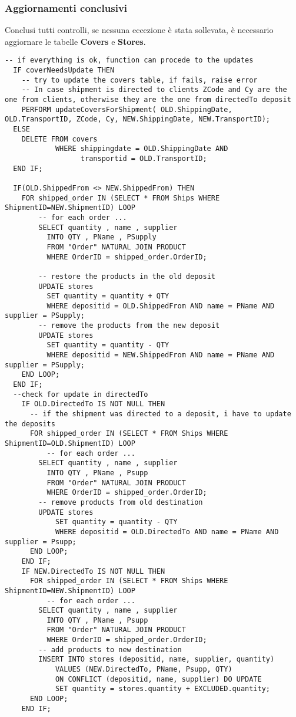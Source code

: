 \newpage

\subsubsection{Aggiornamenti conclusivi}

Conclusi tutti controlli, se nessuna eccezione è stata sollevata, è necessario aggiornare le tabelle \textbf{Covers} e \textbf{Stores}.

\begin{lstlisting}[caption={Sezione di aggiornamento finale}]
  -- if everything is ok, function can procede to the updates
  IF coverNeedsUpdate THEN
    -- try to update the covers table, if fails, raise error
    -- In case shipment is directed to clients ZCode and Cy are the one from clients, otherwise they are the one from directedTo deposit
    PERFORM updateCoversForShipment( OLD.ShippingDate, OLD.TransportID, ZCode, Cy, NEW.ShippingDate, NEW.TransportID);
  ELSE 
    DELETE FROM covers 
            WHERE shippingdate = OLD.ShippingDate AND 
                  transportid = OLD.TransportID;
  END IF;

  IF(OLD.ShippedFrom <> NEW.ShippedFrom) THEN
    FOR shipped_order IN (SELECT * FROM Ships WHERE ShipmentID=NEW.ShipmentID) LOOP
        -- for each order ...
        SELECT quantity , name , supplier 
          INTO QTY , PName , PSupply
          FROM "Order" NATURAL JOIN PRODUCT
          WHERE OrderID = shipped_order.OrderID;

        -- restore the products in the old deposit
        UPDATE stores
          SET quantity = quantity + QTY
          WHERE depositid = OLD.ShippedFrom AND name = PName AND supplier = PSupply;
        -- remove the products from the new deposit
        UPDATE stores
          SET quantity = quantity - QTY
          WHERE depositid = NEW.ShippedFrom AND name = PName AND supplier = PSupply;
    END LOOP;
  END IF;
  --check for update in directedTo
    IF OLD.DirectedTo IS NOT NULL THEN
      -- if the shipment was directed to a deposit, i have to update the deposits
      FOR shipped_order IN (SELECT * FROM Ships WHERE ShipmentID=OLD.ShipmentID) LOOP
          -- for each order ...
        SELECT quantity , name , supplier 
          INTO QTY , PName , Psupp
          FROM "Order" NATURAL JOIN PRODUCT
          WHERE OrderID = shipped_order.OrderID;
        -- remove products from old destination
        UPDATE stores
            SET quantity = quantity - QTY
            WHERE depositid = OLD.DirectedTo AND name = PName AND supplier = Psupp;
      END LOOP;
    END IF;
    IF NEW.DirectedTo IS NOT NULL THEN
      FOR shipped_order IN (SELECT * FROM Ships WHERE ShipmentID=NEW.ShipmentID) LOOP
          -- for each order ...
        SELECT quantity , name , supplier 
          INTO QTY , PName , Psupp
          FROM "Order" NATURAL JOIN PRODUCT
          WHERE OrderID = shipped_order.OrderID;
        -- add products to new destination
        INSERT INTO stores (depositid, name, supplier, quantity)
            VALUES (NEW.DirectedTo, PName, Psupp, QTY)
            ON CONFLICT (depositid, name, supplier) DO UPDATE
            SET quantity = stores.quantity + EXCLUDED.quantity;
      END LOOP;
    END IF;
\end{lstlisting}

